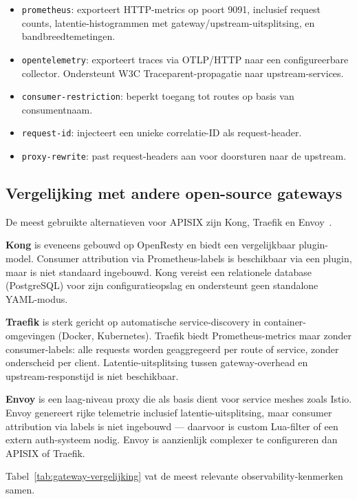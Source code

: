 \begin{itemize}
  \item \texttt{prometheus}: exporteert HTTP-metrics op poort 9091, inclusief request counts, latentie-histogrammen met gateway/upstream-uitsplitsing, en bandbreedtemetingen.
  \item \texttt{opentelemetry}: exporteert traces via OTLP/HTTP naar een configureerbare collector. Ondersteunt W3C Traceparent-propagatie naar upstream-services.
  \item \texttt{consumer-restriction}: beperkt toegang tot routes op basis van consumentnaam.
  \item \texttt{request-id}: injecteert een unieke correlatie-ID als request-header.
  \item \texttt{proxy-rewrite}: past request-headers aan voor doorsturen naar de upstream.
\end{itemize}

\subsection{Vergelijking met andere open-source gateways}

De meest gebruikte alternatieven voor APISIX zijn Kong, Traefik en Envoy~\autocite{NginxAPIGateway2024}.

\textbf{Kong} is eveneens gebouwd op OpenResty en biedt een vergelijkbaar plugin-model. Consumer attribution via Prometheus-labels is beschikbaar via een plugin, maar is niet standaard ingebouwd. Kong vereist een relationele database (PostgreSQL) voor zijn configuratieopslag en ondersteunt geen standalone YAML-modus.

\textbf{Traefik} is sterk gericht op automatische service-discovery in container-omgevingen (Docker, Kubernetes). Traefik biedt Prometheus-metrics maar zonder consumer-labels: alle requests worden geaggregeerd per route of service, zonder onderscheid per client. Latentie-uitsplitsing tussen gateway-overhead en upstream-responstijd is niet beschikbaar.

\textbf{Envoy} is een laag-niveau proxy die als basis dient voor service meshes zoals Istio. Envoy genereert rijke telemetrie inclusief latentie-uitsplitsing, maar consumer attribution via labels is niet ingebouwd --- daarvoor is custom Lua-filter of een extern auth-systeem nodig. Envoy is aanzienlijk complexer te configureren dan APISIX of Traefik.

Tabel~\ref{tab:gateway-vergelijking} vat de meest relevante observability-kenmerken samen.

